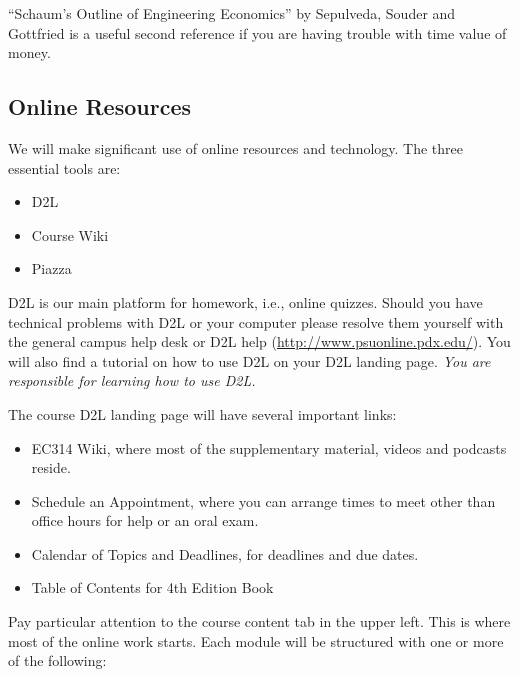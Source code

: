 \documentclass[letterpaper,10pt]{article}
\begin{document}
``Schaum's Outline of Engineering Economics'' by Sepulveda, Souder and Gottfried is a useful second reference if you are having trouble with time value of money.

\subsection{Online Resources}
We will make significant use of online resources and technology.  The
three essential tools are:
\begin{itemize}
\item D2L
\item Course Wiki
\item Piazza
\end{itemize}

D2L is our main platform for homework, i.e., online quizzes.  Should you have technical problems with D2L
or your computer please resolve them yourself with the general campus
help desk or D2L help (\url{http://www.psuonline.pdx.edu/}).  You will
also find a tutorial on how to use D2L on your D2L landing page.
\emph{You are responsible for learning how to use D2L.}


The course D2L landing page will have several important links:
\begin{itemize}
\item EC314 Wiki, where most of the supplementary material, videos and
  podcasts reside.
\item Schedule an Appointment, where you can arrange times to meet
  other than office hours for help or an oral exam.
\item Calendar of Topics and Deadlines, for deadlines and due dates.
\item Table of Contents for 4th Edition Book
\end{itemize}

Pay particular attention to the course content tab in the upper
left. This is where most of the online work starts.  Each module will
be structured with one or more of the following:
\end{document}
